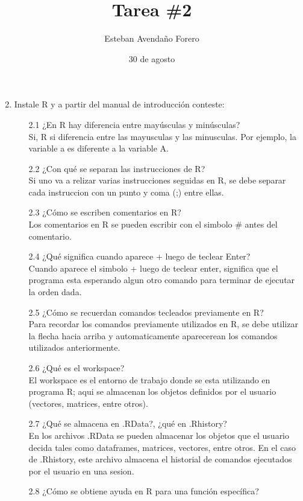 \documentclass[letterpaper, 12pt]{article}
\title{Tarea \#2}
\author{Esteban Avendaño Forero}
\date{30 de agosto}
\begin{document}


\maketitle

\begin{enumerate}
\setcounter{enumi}{1}
\item Instale R y a partir del manual de introducción conteste:
\begin{enumerate}
\item[2.1] ¿En R hay diferencia entre mayúsculas y minúsculas?\\
Si, R si diferencia entre las mayusculas y las minusculas. Por ejemplo, la 
variable a es diferente a la variable A.
\item[2.2] ¿Con qué se separan las instrucciones de R?\\
Si uno va a relizar varias instrucciones seguidas en R, se debe separar cada 
instruccion con un punto y coma (;) entre ellas.
\item[2.3] ¿Cómo se escriben comentarios en R?\\
Los comentarios en R se pueden escribir con el simbolo \# antes del comentario.
\item[2.4] ¿Qué significa cuando aparece + luego de teclear Enter?\\
Cuando aparece el simbolo + luego de teclear enter, significa que el programa 
esta esperando algun otro comando para terminar de ejecutar la orden dada.
\item[2.5] ¿Cómo se recuerdan comandos tecleados previamente en R?\\
Para recordar los comandos previamente utilizados en R, se debe utilizar la 
flecha hacia arriba y automaticamente aparecerean los comandos utilizados 
anteriormente.
\item[2.6] ¿Qué es el workspace?\\
El workspace es el entorno de trabajo donde se esta utilizando en programa R; 
aqui se almacenan los objetos definidos por el usuario (vectores, matrices, 
entre otros).
\item[2.7] ¿Qué se almacena en .RData?, ¿qué en .Rhistory?\\
En los archivos .RData se pueden almacenar los objetos que el usuario decida 
tales como dataframes, matrices, vectores, entre otros. En el caso de .Rhistory,
este archivo almacena el historial de comandos ejecutados por el usuario en una 
sesion.
\item[2.8] ¿Cómo se obtiene ayuda en R para una función específica?\\

\end{enumerate}
\end{enumerate}
\end{document}
